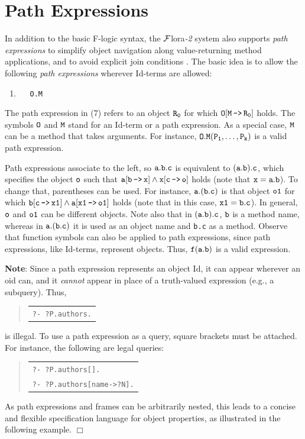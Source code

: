 \documentclass[11pt]{article}
\newcommand{\FLORA}{{\mbox{\sc ${\cal F}${lora}\rm\emph{-2}}}\xspace}
\newcommand{\FLSYSTEM}{\FLORA}
\newenvironment{qrules}{\begin{quote}\tt\begin{tabular}[t]{l}}%
{\end{tabular}\end{quote}}
\newcommand{\mvd}{{\mbox{\tt \,->\,}}}  %
\newcommand{\fl}{\mbox{F-logic}\xspace}
\begin{document}
\section{Path Expressions}\label{sec-pathexpr}


 
In addition to the basic \fl syntax, the \FLSYSTEM  system also supports
\emph{path expressions} to simplify object navigation along
value-returning method applications, and to avoid
explicit join conditions \cite{frohn-lausen-uphoff-VLDB-94}.  The
basic idea is to allow the following \emph{path expressions} wherever
Id-terms are allowed:

  \medskip

\begin{enumerate} 
\item[7.]\label{eq-path-fun} ~~ {\tt O.M}
\end{enumerate} \medskip

\noindent
The path expression in (7) refers to an object $\tt R_0$ for which $\tt
O[M\mvd R_0]$ holds.  The symbols $\tt O$ and $\tt M$ stand for an Id-term
or a path expression.  As a special case, $\tt M$ can be a method that
takes arguments. For instance, $\tt O.M(P_1,\dots,P_k)$ is a valid path
expression.
  
Path expressions
associate to the left, so $\tt a.b.c$ is equivalent to $\tt (a.b).c$, which
specifies the object $\tt o$ such that $\tt a[b\mvd x] \land x[c\mvd o]$
holds (note that $\tt x=a.b$).
To change that, parentheses can be used. For instance, 
$\tt a.(b.c)$ is that object
$\tt o1$ for which $\tt b[c\mvd x1] \land a[x1\mvd o1]$ holds (note that in this
case, $\tt x1=b.c$). In general, $\tt o$ and $\tt o1$ can be different objects.
Note also that in $\tt (a.b).c$, $\tt b$ is a method name, whereas in $\tt
a.(b.c)$ it is used as an object name and {\tt b.c} as a method.  Observe
that function symbols can also be applied to path expressions, since path
expressions, like Id-terms, represent objects. Thus, $\tt f(a.b)$
is a valid expression.

\noindent
{\bf Note}: Since a path expression represents an object Id,
it can appear wherever an oid can, and it \emph{cannot} appear in
place of a truth-valued expression (e.g., a subquery).
Thus,
\begin{qrules}
\tt ?- ?P.authors.
\end{qrules}
is illegal. To use a path expression as a
query, square brackets must be attached. For instance, the following are
legal queries:
\begin{qrules}
   \tt ?- ?P.authors[]. \\
   \tt ?- ?P.authors[name->?N].
\end{qrules}
\noindent
As path expressions and frames can be arbitrarily nested, this leads
to a concise and flexible specification language for object properties, as
illustrated in the following example.
   \hfill$\Box$
\end{document}
